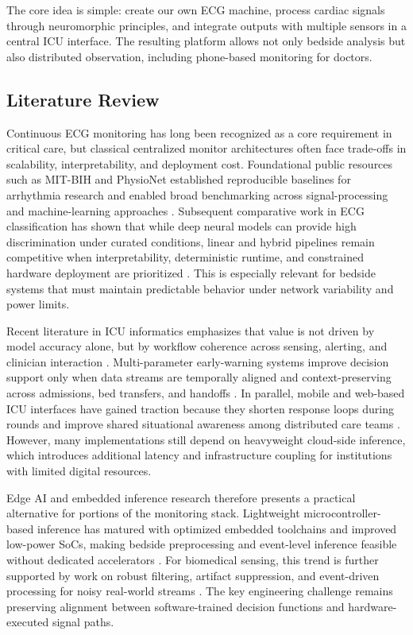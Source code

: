 \documentclass[12pt,a4paper]{article}
\begin{document}
The core idea is simple: create our own ECG machine, process cardiac signals through neuromorphic principles, and integrate outputs with multiple sensors in a central ICU interface. The resulting platform allows not only bedside analysis but also distributed observation, including phone-based monitoring for doctors.

\subsection{Literature Review}

Continuous ECG monitoring has long been recognized as a core requirement in critical care, but classical centralized monitor architectures often face trade-offs in scalability, interpretability, and deployment cost. Foundational public resources such as MIT-BIH and PhysioNet established reproducible baselines for arrhythmia research and enabled broad benchmarking across signal-processing and machine-learning approaches \cite{r1,r2}. Subsequent comparative work in ECG classification has shown that while deep neural models can provide high discrimination under curated conditions, linear and hybrid pipelines remain competitive when interpretability, deterministic runtime, and constrained hardware deployment are prioritized \cite{r3,r7,r8}. This is especially relevant for bedside systems that must maintain predictable behavior under network variability and power limits.

Recent literature in ICU informatics emphasizes that value is not driven by model accuracy alone, but by workflow coherence across sensing, alerting, and clinician interaction \cite{r4,r5}. Multi-parameter early-warning systems improve decision support only when data streams are temporally aligned and context-preserving across admissions, bed transfers, and handoffs \cite{r6,r9}. In parallel, mobile and web-based ICU interfaces have gained traction because they shorten response loops during rounds and improve shared situational awareness among distributed care teams \cite{r10,r11}. However, many implementations still depend on heavyweight cloud-side inference, which introduces additional latency and infrastructure coupling for institutions with limited digital resources.

Edge AI and embedded inference research therefore presents a practical alternative for portions of the monitoring stack. Lightweight microcontroller-based inference has matured with optimized embedded toolchains and improved low-power SoCs, making bedside preprocessing and event-level inference feasible without dedicated accelerators \cite{r12,r13}. For biomedical sensing, this trend is further supported by work on robust filtering, artifact suppression, and event-driven processing for noisy real-world streams \cite{r14,r15}. The key engineering challenge remains preserving alignment between software-trained decision functions and hardware-executed signal paths.
\end{document}
